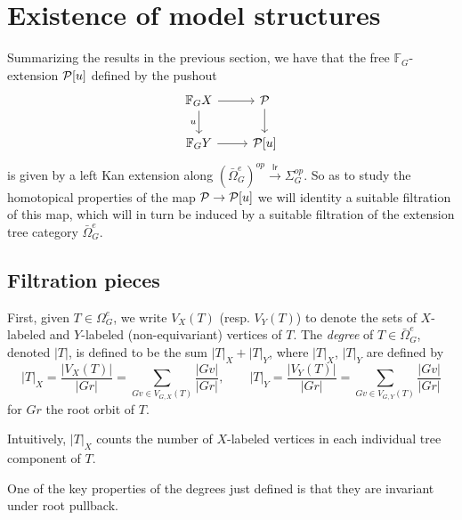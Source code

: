 \documentclass[a4paper,10pt]{article}%
\begin{document}
\newpage



\section{Existence of model structures}
\label{MODEL_STRUCTURES_SECTION}

Summarizing the results in the previous section, we have that the free $\mathbb F_G$-extension $\P[u]$ defined by the pushout
\begin{equation}\label{CELLEXTPUSH EQ}
\begin{tikzcd}
  \mathbb F_G X \arrow[d, "u"'] \arrow[r] & \P \arrow[d]\\
  \mathbb F_G Y \arrow[r] & \P[u]
\end{tikzcd}
\end{equation}
is given by a left Kan extension along 
$(\bar{\Omega}_{G}^e)^{op} \xrightarrow{\mathsf{lr}} \Sigma_G^{op}$. So as to study the homotopical properties of the map $\P \to \P[u]$ we will identity a suitable filtration of this map, which will in turn be induced by a suitable filtration of the extension tree category $\bar{\Omega}_{G}^e$.


\subsection{Filtration pieces}

First, given $T\in \Omega_G^e$, we write $V_X(T)$ (resp. $V_Y(T)$) to denote the sets of $X$-labeled and $Y$-labeled (non-equivariant) vertices of $T$.
The \textit{degree} of $T \in \bar{\Omega}_{G}^e$,
denoted $|T|$, is defined to be the sum $|T|_X + |T|_Y$, where $|T|_X$, $|T|_Y$ are defined by
\[
|T|_X = \dfrac{|V_X(T)|}{|G r|} = \sum\limits_{G v\in V_{G,X}(T)}\dfrac{|G v|}{|G r|},
\qquad
|T|_Y = \dfrac{|V_Y(T)|}{|G r|} = \sum\limits_{G v\in V_{G,Y}(T)}\dfrac{|G v|}{|G r|}
\]
for $G r$ the root orbit of $T$. 

Intuitively, $|T|_X$ counts the number of $X$-labeled vertices in each individual tree component of $T$.


\begin{remark}
	One of the key properties of the degrees just defined is that they are invariant under root pullback.
\end{remark}
\end{document}
